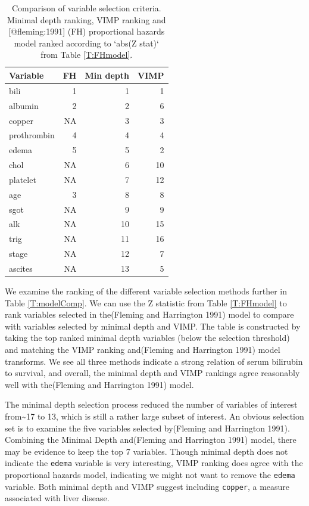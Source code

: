 \documentclass[article, nojss]{jss}
\begin{document}
\begin{Schunk}
\begin{table}

\caption{\label{tab:models}Comparison of variable selection criteria. Minimal depth ranking, VIMP ranking and [@fleming:1991] (FH) proportional hazards model ranked according to `abs(Z stat)` from Table \ref{T:FHmodel}.}
\centering
\begin{tabular}[t]{l|r|r|r}
\hline
Variable & FH & Min depth & VIMP\\
\hline
bili & 1 & 1 & 1\\
\hline
albumin & 2 & 2 & 6\\
\hline
copper & NA & 3 & 3\\
\hline
prothrombin & 4 & 4 & 4\\
\hline
edema & 5 & 5 & 2\\
\hline
chol & NA & 6 & 10\\
\hline
platelet & NA & 7 & 12\\
\hline
age & 3 & 8 & 8\\
\hline
sgot & NA & 9 & 9\\
\hline
alk & NA & 10 & 15\\
\hline
trig & NA & 11 & 16\\
\hline
stage & NA & 12 & 7\\
\hline
ascites & NA & 13 & 5\\
\hline
\end{tabular}
\end{table}

\end{Schunk}

We examine the ranking of the different variable selection methods
further in Table \ref{T:modelComp}. We can use the Z statistic from
Table \ref{T:FHmodel} to rank variables selected in the(Fleming and
Harrington 1991) model to compare with variables selected by minimal
depth and VIMP. The table is constructed by taking the top ranked
minimal depth variables (below the selection threshold) and matching the
VIMP ranking and(Fleming and Harrington 1991) model transforms. We see
all three methods indicate a strong relation of serum bilirubin to
survival, and overall, the minimal depth and VIMP rankings agree
reasonably well with the(Fleming and Harrington 1991) model.

The minimal depth selection process reduced the number of variables of
interest from\textasciitilde{}17 to 13, which is still a rather large
subset of interest. An obvious selection set is to examine the five
variables selected by(Fleming and Harrington 1991). Combining the
Minimal Depth and(Fleming and Harrington 1991) model, there may be
evidence to keep the top 7 variables. Though minimal depth does not
indicate the \texttt{edema} variable is very interesting, VIMP ranking
does agree with the proportional hazards model, indicating we might not
want to remove the \texttt{edema} variable. Both minimal depth and VIMP
suggest including \texttt{copper}, a measure associated with liver
disease.
\end{document}
